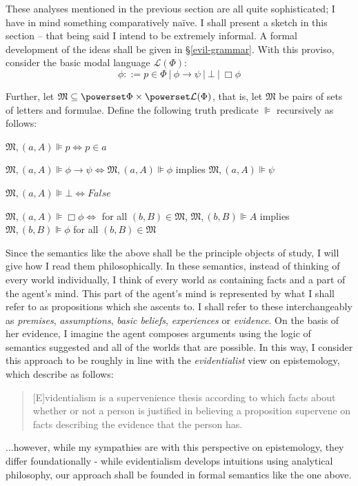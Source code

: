 \documentclass[11pt]{article}
\numberwithin{equation}{subsection}
\renewcommand{\Omega}{\mathfrak{M}}
\begin{document}
These analyses mentioned in the previous section are all quite
sophisticated; I have in mind something comparatively na\"{i}ve.  
I shall present a sketch in this section -- that being said I intend
to be extremely informal.  A formal development of the ideas shall be 
given in \S\ref{evil-grammar}.  With this proviso, consider the basic
modal language $\mathcal{L}(\Phi)$:
\[ \phi ::= p \in \Phi \ |\ \phi \to \psi \ | \ \bot \ |\ \Box \phi \]

Further, let $\Omega \subseteq \powerset \Phi \times \powerset \mathcal{L}(\Phi)$, that is, let $\Omega$ be pairs of sets of letters and formulae. Define the following truth predicate $\VDash$ recursively as follows:
\begin{empt}
 \item $\Omega, (a,A) \VDash p \iff p \in a$
 \item $\Omega, (a,A) \VDash \phi \to \psi \iff \Omega, (a,A) \VDash \phi$ implies $\Omega, (a,A) \VDash \psi$
 \item $\Omega, (a,A) \VDash \bot \iff False$
 \item $\Omega, (a,A) \VDash \Box \phi \iff $ for all $(b,B) \in \Omega$, $\Omega,(b,B) \VDash A$ implies $\Omega, (b,B)\VDash \phi$ for all $(b,B) \in \Omega$
\end{empt}

Since the semantics like the above shall be the principle objects of
study, I will give how I read them philosophically.  In these
semantics, instead of thinking of every world individually, I think of
every world as containing facts and a part of the agent's mind.  This
part of the agent's mind is represented by what I shall refer to as
propositions which she ascents to. I shall refer to these
interchangeably as \emph{premises}, \emph{assumptions}, \emph{basic
  beliefs}, \emph{experiences} or \emph{evidence}.  On the basis of
her evidence, I imagine the agent composes arguments using the logic
of semantics suggested and all of the worlds that are possible.  In
this way, I consider this approach to be roughly in line with the
\emph{evidentialist} view on epistemology, which
\citet{conee_evidentialism_2004} describe as follows:
\begin{quote}
  [E]videntialism is a supervenience thesis according to which facts
  about whether or not a person is justified in believing a
  proposition supervene on facts describing the evidence that the
  person has.
\end{quote}
$\ldots$however, while my sympathies are with this perspective on
epistemology, they differ foundationally - while evidentialism
develops intuitions using analytical philosophy, our approach shall be
founded in formal semantics like the one above.
\end{document}
